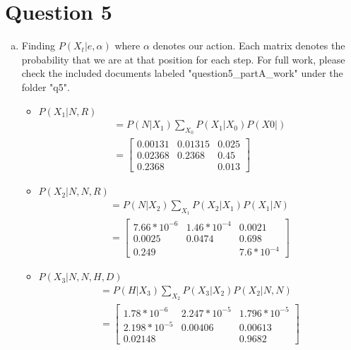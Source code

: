 \documentclass{article}
\begin{document}
\section*{Question 5}
\begin{enumerate}[a)]
    \item Finding $P(X_t | e, \alpha)$ where $\alpha$ denotes our action. Each matrix denotes
        the probability that we are at that position for each step. For full work, please
        check the included documents labeled "question5\_partA\_work" under the folder "q5".
    \begin{itemize}
        \item $P(X_1 | N, R)$
        \begin{gather*}
            = P(N|X_1)\sum_{X_0}P(X_1|X_0)P(X0|)\\
            =
            \begin{bmatrix}
                0.00131 & 0.01315 & 0.025 \\
                0.02368 & 0.2368 & 0.45 \\
                0.2368 &  & 0.013
            \end{bmatrix}
        \end{gather*}
        
        \item $P(X_2 | N, N, R)$
        \begin{gather*}
            = P(N|X_2)\sum_{X_1}P(X_2|X_1)P(X_1|N) \\
            =
            \begin{bmatrix}
                7.66*10^{-6} & 1.46 * 10^{-4} & 0.0021 \\
                0.0025 & 0.0474 & 0.698\\
                0.249 & & 7.6 * 10^{-4}
            \end{bmatrix}
        \end{gather*}
        
        \item $P(X_3 | N, N, H, D)$
        \begin{gather*}
            = P(H|X_3)\sum_{X_2}P(X_3|X_2)P(X_2|N, N)\\
            =
            \begin{bmatrix}
                1.78 * 10^{-6} & 2.247 * 10^{-5} & 1.796 * 10^{-5} \\
                2.198 * 10^{-5} & 0.00406 & 0.00613\\
                0.02148 & & 0.9682
            \end{bmatrix}
        \end{gather*}
        

\end{itemize}
\end{enumerate}
\end{document}
